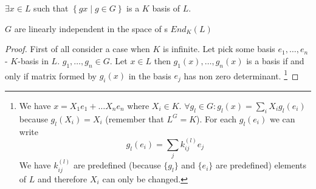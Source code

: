 \begin{theorem}
  $\exists x \in L$ such that
  $\left\{gx \mid g \in G\right\}$ is a $K$ basis of $L$.

  $G$ are
  linearly independent in the space of s
  $End_{K}\left(L\right)$
  \label{thm:normalbase}
  \begin{proof}
    First of all consider a case when $K$ is infinite. Let pick some
    basis $e_1, \dots, e_n$ - $K$-basis in $L$. $g_1, \dots, g_n \in
    G$. Let $x \in L$ then $g_1\left(x\right), \dots,
    g_n\left(x\right)$ is a basis if and only if matrix formed by
    $g_i\left(x\right)$ in the basis $e_j$ has non zero
    determinant.
    \footnote{
      We have $x = X_1 e_1 + \dots X_n e_n$ where $X_i \in K$.
      $\forall g_l \in G: g_l(x) = \sum_i X_i g_l(e_i)$
      because $g_l(X_i) = X_i$ (remember that $L^G = K$).
      For each $g_l(e_i)$ we can write
      \[
      g_l(e_i) = \sum_j k_{ij}^{(l)} e_j
      \]      
      We have $k_{ij}^{(l)}$ are predefined
      (because $\{g_l\}$ and $\{e_i\}$ are predefined)
      elements of $L$ and therefore $X_i$ can only be changed.

}
\end{proof}
\end{theorem}
